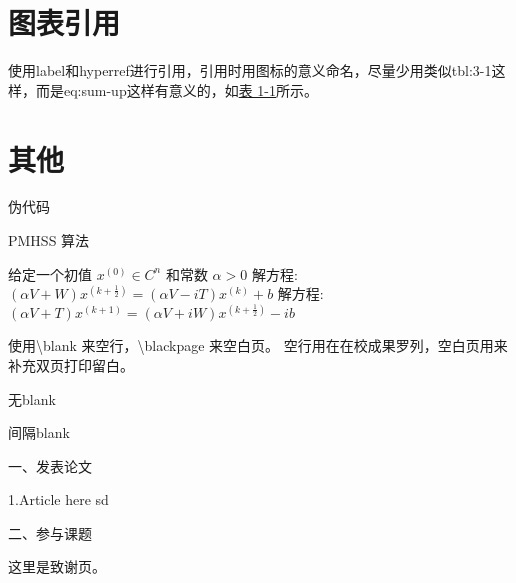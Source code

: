 \documentclass[AutoFakeBold]{LZUThesis-PgD&PhD}
\begin{document}
\section{图表引用}


使用label和hyperref进行引用，引用时用图标的意义命名，尽量少用类似tbl:3-1这样，而是eq:sum-up这样有意义的，如\hyperref[tbl:mole]{表 1-1}所示。

\section{其他}


伪代码

\begin{algorithm}[H]
  \caption{PMHSS 算法\label{Alg:PMHSS}}
  \begin{algorithmic}[1]
    \State 给定一个初值 $ x^{(0)} \in C^{n} $  和常数 $\alpha>0$
    \State 解方程: $(\alpha V+W)x^{(k+\frac{1}{2})}=(\alpha V-i T)x^{(k)}+b $
    \State 解方程: $(\alpha V+T)x^{(k+1)}=(\alpha V+i W)x^{(k+\frac{1}{2})}-i b$
    \EndFor
  \end{algorithmic}
\end{algorithm}

使用\textbackslash blank 来空行，\textbackslash blackpage 来空白页。
空行用在在校成果罗列，空白页用来补充双页打印留白。

无blank

\blank

间隔blank
\blankpage




\backmatter


\printbib



\Achievements
一、发表论文

1.Article here sd

\blank

二、参与课题




\Thanks

这里是致谢页。
\end{document}
